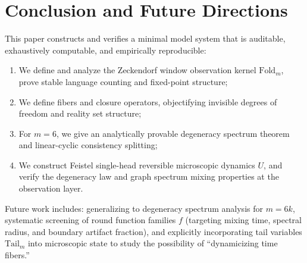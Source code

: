\section{Conclusion and Future Directions}

This paper constructs and verifies a minimal model system that is auditable, exhaustively computable, and empirically reproducible:
\begin{enumerate}
  \item We define and analyze the Zeckendorf window observation kernel $\mathrm{Fold}_m$, prove stable language counting and fixed-point structure;
  \item We define fibers and closure operators, objectifying invisible degrees of freedom and reality set structure;
  \item For $m=6$, we give an analytically provable degeneracy spectrum theorem and linear-cyclic consistency splitting;
  \item We construct Feistel single-head reversible microscopic dynamics $U$, and verify the degeneracy law and graph spectrum mixing properties at the observation layer.
\end{enumerate}

Future work includes: generalizing to degeneracy spectrum analysis for $m=6k$, systematic screening of round function families $f$ (targeting mixing time, spectral radius, and boundary artifact fraction), and explicitly incorporating tail variables $\mathrm{Tail}_m$ into microscopic state to study the possibility of ``dynamicizing time fibers.''
